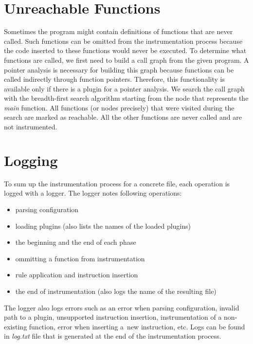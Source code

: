 \section{Unreachable Functions}

Sometimes the program might contain definitions of functions that are never
called. Such functions can be omitted from the instrumentation process because
the code inserted to these functions would never be executed. To determine what
functions are called, we first need to build a call graph from the given
program. A pointer analysis is necessary for building this graph because
functions can be called indirectly through function pointers. Therefore, this
functionality is available only if there is a plugin for a pointer analysis. We
search the call graph with the breadth-first search algorithm starting from the
node that represents the \emph{main} function. All functions (or nodes
precisely) that were visited during the search are marked as reachable. All the
other functions are never called and are not instrumented.


\section{Logging}

To sum up the instrumentation process for a concrete file, each operation is
logged with a logger. The logger notes following operations:
\begin{itemize}
  \item parsing configuration
  \item loading plugins (also lists the names of the loaded plugins)
  \item the beginning and the end of each phase
  \item ommitting a function from instrumentation
  \item rule application and instruction insertion
  \item the end of instrumentation (also logs the name of the resulting file)
\end{itemize}
The logger also logs errors such as an error when parsing configuration, invalid
path to a plugin, unsupported instruction insertion, instrumentation of a
non-existing function, error when inserting a~new instruction, etc. Logs can be
found in \emph{log.txt} file that is generated at the end of the
instrumentation process.

